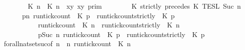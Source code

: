 \begin{isabellebody}
\isanewline
\ \ \ \ \ \ {\isasymlbrakk}\ {\isacharparenleft}{\isasymlceil}{\isacharhash}\isactrlsup {\isasymle}\ K\ n{\isacharcomma}\ {\isacharhash}\isactrlsup {\isacharless}\ K\ n{\isasymrceil}\ {\isasymin}\ {\isacharparenleft}{\isasymlambda}{\isacharparenleft}x{\isacharcomma}y{\isacharparenright}{\isachardot}\ x{\isasymle}y{\isacharparenright}{\isacharparenright}\ {\isasymrbrakk}\isactrlsub p\isactrlsub r\isactrlsub i\isactrlsub m\isanewline
\ \ \ \ \ \ {\isasyminter}\ {\isasymlbrakk}\ K\ strictly\ precedes\ K\ {\isasymrbrakk}\isactrlsub T\isactrlsub E\isactrlsub S\isactrlsub L\isactrlbsup {\isasymge}\ Suc\ n\isactrlesup {\isacartoucheclose}\isanewline
%
\isadelimproof
%
\endisadelimproof
%
\isatagproof
{}\isamarkupfalse%
\ {\isacharminus}\isanewline
\ \ \isamarkupfalse%
\ {\isacartoucheopen}{\isacharbraceleft}{\isasymrho}{\isachardot}\ {\isasymforall}p{\isasymge}n{\isachardot}\ {\isacharparenleft}run{\isacharunderscore}tick{\isacharunderscore}count\ {\isasymrho}\ K\ p{\isacharparenright}\ {\isasymle}\ {\isacharparenleft}run{\isacharunderscore}tick{\isacharunderscore}count{\isacharunderscore}strictly\ {\isasymrho}\ K\ p{\isacharparenright}{\isacharbraceright}\isanewline
\ \ \ \ \ \ \ \ \ {\isacharequal}\ {\isacharbraceleft}{\isasymrho}{\isachardot}\ {\isacharparenleft}run{\isacharunderscore}tick{\isacharunderscore}count\ {\isasymrho}\ K\ n{\isacharparenright}\ {\isasymle}\ {\isacharparenleft}run{\isacharunderscore}tick{\isacharunderscore}count{\isacharunderscore}strictly\ {\isasymrho}\ K\ n{\isacharparenright}{\isacharbraceright}\isanewline
\ \ \ \ \ \ \ \ \ {\isasyminter}\ {\isacharbraceleft}{\isasymrho}{\isachardot}\ {\isasymforall}p{\isasymge}Suc\ n{\isachardot}\ {\isacharparenleft}run{\isacharunderscore}tick{\isacharunderscore}count\ {\isasymrho}\ K\ p{\isacharparenright}\ {\isasymle}\ {\isacharparenleft}run{\isacharunderscore}tick{\isacharunderscore}count{\isacharunderscore}strictly\ {\isasymrho}\ K\ p{\isacharparenright}{\isacharbraceright}{\isacartoucheclose}\isanewline
\ \ \ \ \isamarkupfalse%
\ forall{\isacharunderscore}nat{\isacharunderscore}set{\isacharunderscore}suc{\isacharbrackleft}of\ {\isacartoucheopen}n{\isacartoucheclose}\ {\isacartoucheopen}{\isasymlambda}{\isasymrho}\ n{\isachardot}\ {\isacharparenleft}run{\isacharunderscore}tick{\isacharunderscore}count\ {\isasymrho}\ K\ n{\isacharparenright}\isanewline

\end{isabellebody}
